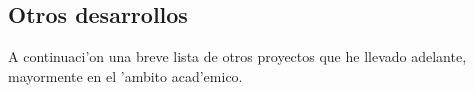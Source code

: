 \subsection*{Otros desarrollos}
A continuaci'on una breve lista de otros proyectos que he llevado adelante, mayormente en el 'ambito
acad'emico.



%
